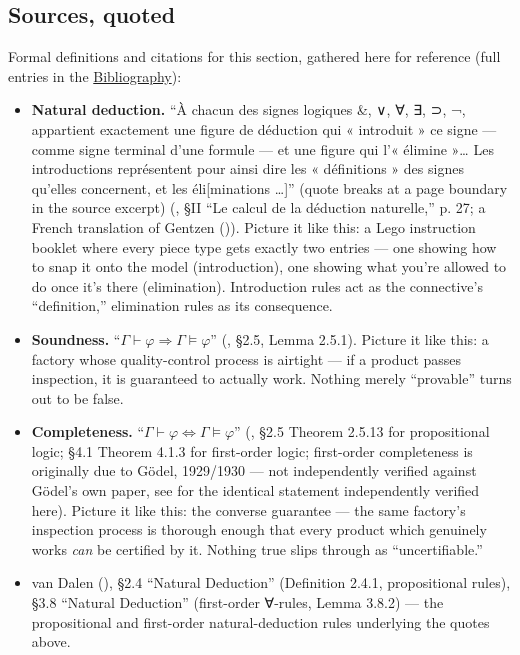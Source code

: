 \subsection{Sources, quoted}\label{sec:03-propositions-and-proofs:02-logic-recap:8}

Formal definitions and citations for this section, gathered here for reference (full entries in the \hyperref[sec:root:bibliography:1]{Bibliography}):

\begin{itemize}
\tightlist
\item
  \textbf{Natural deduction.} ``À chacun des signes logiques \&, ∨, ∀, ∃, ⊃, ¬, appartient exactement une figure de déduction qui « introduit » ce signe --- comme signe terminal d'une formule --- et une figure qui l'« élimine »\ldots{} Les introductions représentent pour ainsi dire les « définitions » des signes qu'elles concernent, et les éli{[}minations \ldots{]}'' (quote breaks at a page boundary in the source excerpt) (\cite{FeysLadriere1955}, §II ``Le calcul de la déduction naturelle,'' p. 27; a French translation of Gentzen (\cite{Gentzen1935})). Picture it like this: a Lego instruction booklet where every piece type gets exactly two entries --- one showing how to snap it onto the model (introduction), one showing what you're allowed to do once it's there (elimination). Introduction rules act as the connective's ``definition,'' elimination rules as its consequence.
\item
  \textbf{Soundness.} ``\(\Gamma \vdash \varphi \Rightarrow \Gamma \models
  \varphi\)'' (\cite{VanDalen2013}, §2.5, Lemma 2.5.1). Picture it like this: a factory whose quality-control process is airtight --- if a product passes inspection, it is guaranteed to actually work. Nothing merely ``provable'' turns out to be false.
\item
  \textbf{Completeness.} ``\(\Gamma \vdash \varphi \Leftrightarrow \Gamma
  \models \varphi\)'' (\cite{VanDalen2013}, §2.5 Theorem 2.5.13 for propositional logic; §4.1 Theorem 4.1.3 for first-order logic; first-order completeness is originally due to Gödel, 1929/1930 --- not independently verified against Gödel's own paper, see \cite{VanDalen2013} for the identical statement independently verified here). Picture it like this: the converse guarantee --- the same factory's inspection process is thorough enough that every product which genuinely works \emph{can} be certified by it. Nothing true slips through as ``uncertifiable.''
\item
  van Dalen (\cite{VanDalen2013}), §2.4 ``Natural Deduction'' (Definition 2.4.1, propositional rules), §3.8 ``Natural Deduction'' (first-order ∀-rules, Lemma 3.8.2) --- the propositional and first-order natural-deduction rules underlying the quotes above.

\end{itemize}
